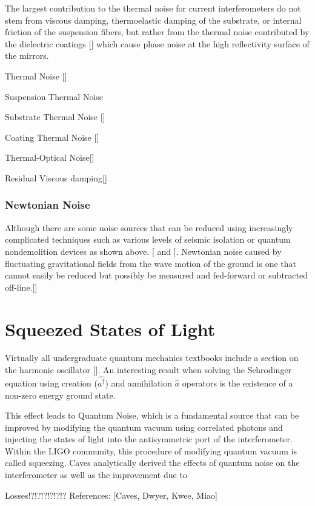 		The largest contribution to the thermal noise for current interferometers do not stem from viscous damping, thermoelastic damping of the substrate, or internal friction of the suspension fibers, but rather from the thermal noise contributed by the dielectric coatings [\cite{HarryThermalCoat}] which cause phase noise at the high reflectivity surface of the mirrors.
		
		
		Thermal Noise [\cite{SaulsonThermalNoise}]
		
		Suspension Thermal Noise \cite{SaulsonThermalSus}
		
		Substrate Thermal Noise [\cite{Saulson}]
		
		Coating Thermal Noise [\cite{HarryThermalCoat}]
		
		Thermal-Optical Noise[\cite{EvansBallmerThermalOptic}]
		
		Residual Viscous damping[\cite{Saulson}]
		
		\subsubsection{Newtonian Noise}
		Although there are some noise sources that can be reduced using increasingly complicated techniques such as various levels of seismic isolation or quantum nondemolition devices as shown above. [\cite{SaulsonNewtonian} and \cite{ThorneNewtonian}].  Newtonian noise caused by fluctuating gravitational fields from the wave motion of the ground is one that cannot easily be reduced but possibly be measured and fed-forward or subtracted off-line.[\cite{DriggersNewtonian}]
		
	
	\section{Squeezed States of Light}

	Virtually all undergraduate quantum mechanics textbooks include a section on the harmonic oscillator [\cite{Shankar}].  An interesting result when solving the Schrodinger equation using creation ($\hat{a^{\dagger}}$) and annihilation $\hat{a}$ operators is the existence of a non-zero energy ground state. 
	
	This effect leads to Quantum Noise, which is a fundamental source that can be improved by modifying the quantum vacuum using correlated photons and injecting the states of light into the antisymmetric port of the interferometer.  Within the LIGO community, this procedure of modifying quantum vacuum is called squeezing. Caves analytically derived the effects of quantum noise on the interferometer as well as the improvement due to	
	
	Losses!?!?!?!?!?!?
	References: [Caves, Dwyer, Kwee, Miao]
	